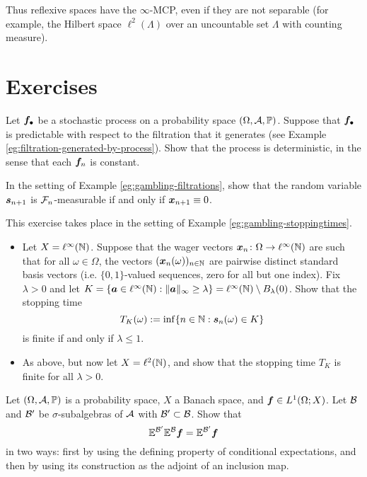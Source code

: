 Thus reflexive spaces have the $\infty$-MCP, even if they are not separable (for example, the Hilbert space $\ell^2(\Lambda)$ over an uncountable set $\Lambda$ with counting measure).


\section*{Exercises}

\begin{exercise}
  Let $\bm{f}_{\bullet}$ be a stochastic process on a probability space $(\Omega,\mathcal{A},\mathbb{P})$.
  Suppose that $\bm{f}_{\bullet}$ is predictable with respect to the filtration that it generates (see Example \ref{eg:filtration-generated-by-process}).
  Show that the process is deterministic, in the sense that each $\bm{f}_n$ is constant.
\end{exercise}

\begin{exercise}\label{ex:winnings-unpredictability}
  In the setting of Example \ref{eg:gambling-filtrations}, show that the random variable $\bm{s}_{n+1}$ is $\mathcal{F}_n$-measurable if and only if $\bm{x}_{n+1} \equiv 0$.
\end{exercise}

\begin{exercise}\label{ex:gambling-in-linfty}
  This exercise takes place in the setting of Example \ref{eg:gambling-stoppingtimes}.
  \begin{itemize}
  \item
    Let $X = \ell^\infty(\mathbb{N})$.
    Suppose that the wager vectors $\bm{x}_n \colon \Omega \rightarrow \ell^\infty(\mathbb{N})$ are such that for all $\omega \in \Omega$, the vectors $(\bm{x}_n(\omega))_{n \in \mathbb{N}}$ are pairwise distinct standard basis vectors (i.e. $\{0,1\}$-valued sequences, zero for all but one index).
    Fix $\lambda > 0$ and let $K = \{\bm{a} \in \ell^\infty(\mathbb{N}) : \|\bm{a}\|_\infty \geq \lambda\} = \ell^\infty(\mathbb{N}) \setminus B_\lambda(0)$.
    Show that the stopping time
    \begin{equation*}
      T_K(\omega) := \inf\{n \in \mathbb{N} : \bm{s}_n(\omega) \in K\} 
    \end{equation*}
    is finite if and only if $\lambda \leq 1$.
  \item
    As above, but now let $X = \ell^2(\mathbb{N})$, and show that the stopping time $T_K$ is finite for all $\lambda > 0$.
  \end{itemize}
\end{exercise}

\begin{exercise}\label{ex:CE-monotonicity}
  Let $(\Omega,\mathcal{A},\mathbb{P})$ is a probability space, $X$ a Banach space, and $\bm{f} \in L^1(\Omega;X)$.
  Let $\mathcal{B}$ and $\mathcal{B}'$ be $\sigma$-subalgebras of $\mathcal{A}$ with $\mathcal{B}' \subset \mathcal{B}$.
  Show that
  \begin{equation*}
    \mathbb{E}^{\mathcal{B}'} \mathbb{E}^{\mathcal{B}} \bm{f} = \mathbb{E}^{\mathcal{B}'} \bm{f}
  \end{equation*}
  in two ways: first by using the defining property of conditional expectations, and then by using its construction as the adjoint of an inclusion map.
\end{exercise}

